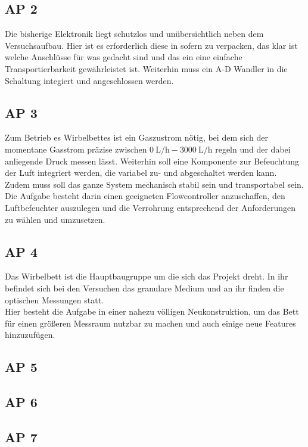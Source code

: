 \subsection{AP 2}

Die bisherige Elektronik liegt schutzlos und unübersichtlich neben dem Versuchsaufbau. Hier ist es erforderlich diese in sofern zu verpacken, das klar ist welche Anschlüsse für was gedacht sind und das ein eine einfache Transportierbarkeit gewährleistet ist.
Weiterhin muss ein A-D Wandler in die Schaltung integiert und angeschlossen werden.

\subsection{AP 3}

Zum Betrieb es Wirbelbettes ist ein Gaszustrom nötig, bei dem sich der momentane Gasstrom präzise zwischen $\SI{0}{\liter / \hour} - \SI{3000}{\liter / \hour}$ regeln und der dabei anliegende Druck messen lässt. Weiterhin soll eine Komponente zur Befeuchtung der Luft integriert werden, die variabel zu- und abgeschaltet werden kann. \\
Zudem muss soll das ganze System mechanisch stabil sein und transportabel sein. \\
Die Aufgabe besteht darin einen geeigneten Flowcontroller anzuschaffen, den Luftbefeuchter auszulegen und die Verrohrung entsprechend der Anforderungen zu wählen und umzusetzen.

\subsection{AP 4}

Das Wirbelbett ist die Hauptbaugruppe um die sich das Projekt dreht. In ihr befindet sich bei den Versuchen das granulare Medium und an ihr finden die optischen Messungen statt. \\
Hier besteht die Aufgabe in einer nahezu völligen Neukonstruktion, um das Bett für einen größeren Messraum nutzbar zu machen und auch einige neue Features hinzuzufügen.


\subsection{AP 5}

\subsection{AP 6}

\subsection{AP 7}






















